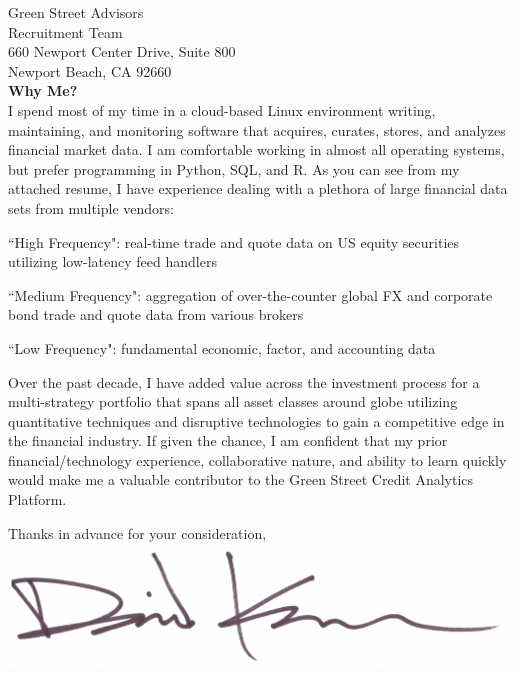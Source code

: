 \documentclass{letter}
\begin{document}
\begin{letter}{
  Green Street Advisors \\
  Recruitment Team \\
  660 Newport Center Drive, Suite 800 \\
  Newport Beach, CA 92660 \\
}
\textbf{Why Me?} \\
I spend most of my time in a cloud-based Linux environment writing, maintaining,
and monitoring software that acquires, curates, stores, and analyzes financial
market data. I am comfortable working in almost all operating systems, but prefer
programming in Python, SQL, and R. As you can see from my attached resume, I have
experience dealing with a plethora of large financial data sets from multiple
vendors:
\begin{list}{}{\leftmargin=1em}
  \item ``High Frequency": real-time trade and quote data on US equity securities
  utilizing low-latency feed handlers
  \item ``Medium Frequency": aggregation of over-the-counter global FX and
  corporate bond trade and quote data from various brokers
  \item ``Low Frequency": fundamental economic, factor, and accounting data
\end{list}
Over the past decade, I have added value across the investment process
for a multi-strategy portfolio that spans all asset classes around globe
utilizing quantitative techniques and disruptive technologies to gain
a competitive edge in the financial industry. If given the chance, I am confident
that my prior financial/technology experience, collaborative nature, and ability
to learn quickly would make me a valuable contributor to the Green Street Credit
Analytics Platform.
 
\closing{
  Thanks in advance for your consideration, \\
  \includegraphics[scale=0.33]{signature.png}
}

\end{letter}
\end{document}
